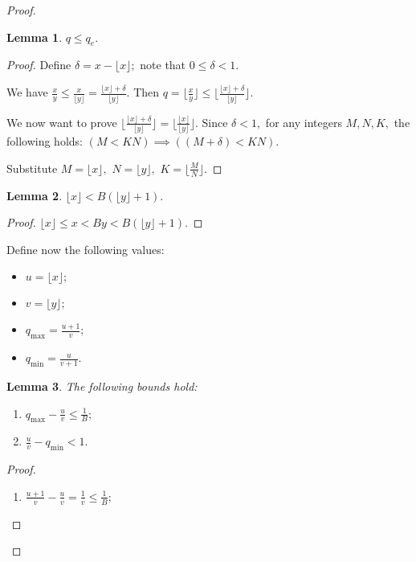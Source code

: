 \documentclass[a4paper,12pt]{article}
\newtheorem{lemma}{Lemma}
\newcommand{\floor}[1] {\lfloor #1 \rfloor}
\begin{document}
\begin{proof}
    \begin{lemma}
        $q \le q_e.$
    \end{lemma}
    \begin{proof}
        Define $\delta = x - \floor{x};$
        note that $0 \le \delta < 1.$

        We have $\frac{x}{y} \le \frac{x}{\floor{y}} = \frac{\floor{x} + \delta}{\floor{y}}.$
        Then $q = \floor{\frac{x}{y}} \le \floor{\frac{\floor{x} + \delta}{\floor{y}}}.$

        We now want to prove $\floor{\frac{\floor{x} + \delta}{\floor{y}}} = \floor{\frac{\floor x}{\floor y}}.$
        Since $\delta < 1,$ for any integers $M, N, K,$ the following holds: $(M < KN) \implies ((M + \delta) < KN).$

        Substitute $M = \floor{x},$ $N = \floor{y},$ $K = \floor{\frac{M}{N}}.$
    \end{proof}

    \begin{lemma}
    \label{lemma:floorx_bound}
        $\floor{x} < B (\floor{y} + 1).$
    \end{lemma}
    \begin{proof}
        $\floor{x} \le x < By < B(\floor{y} + 1).$
    \end{proof}

    Define now the following values:
    \begin{itemize}
        \item $u = \floor{x};$
        \item $v = \floor{y};$
        \item $q_{\max} = \frac{u+1}{v};$
        \item $q_{\min} = \frac{u}{v+1}.$
    \end{itemize}

    \begin{lemma}
    \label{lemma:bounds}
        The following bounds hold:
        \begin{enumerate}
            \item $q_{\max} - \frac{u}{v} \le \frac{1}{B};$
            \item $\frac{u}{v} - q_{\min} < 1.$
        \end{enumerate}
    \end{lemma}
    \begin{proof}
        \begin{enumerate}
            \item $\frac{u+1}{v} - \frac{u}{v} = \frac{1}{v} \le \frac{1}{B};$


\end{enumerate}
\end{proof}
\end{proof}
\end{document}
